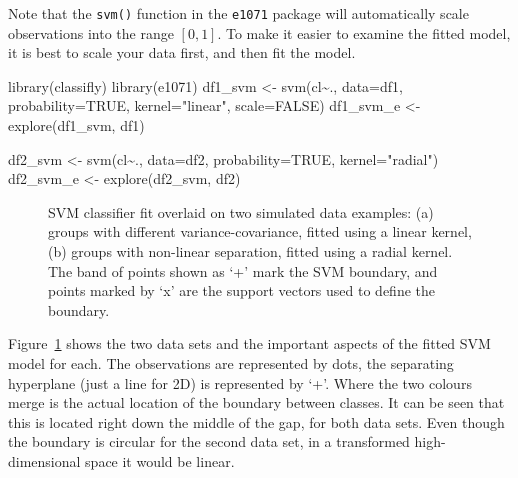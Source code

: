 \documentclass[
  letterpaper,
]{krantz}
\newenvironment{Shaded}{\begin{snugshade}}{\end{snugshade}}
\newcommand{\AttributeTok}[1]{\textcolor[rgb]{0.40,0.45,0.13}{#1}}
\newcommand{\ConstantTok}[1]{\textcolor[rgb]{0.56,0.35,0.01}{#1}}
\newcommand{\FunctionTok}[1]{\textcolor[rgb]{0.28,0.35,0.67}{#1}}
\newcommand{\NormalTok}[1]{\textcolor[rgb]{0.00,0.23,0.31}{#1}}
\newcommand{\OtherTok}[1]{\textcolor[rgb]{0.00,0.23,0.31}{#1}}
\newcommand{\SpecialCharTok}[1]{\textcolor[rgb]{0.37,0.37,0.37}{#1}}
\newcommand{\StringTok}[1]{\textcolor[rgb]{0.13,0.47,0.30}{#1}}
\begin{document}
Note that the \texttt{svm()} function in the \texttt{e1071} package will
automatically scale observations into the range \([0,1]\). To make it
easier to examine the fitted model, it is best to scale your data first,
and then fit the model.

\begin{Shaded}
\begin{Highlighting}[]
\FunctionTok{library}\NormalTok{(classifly)}
\FunctionTok{library}\NormalTok{(e1071)}
\NormalTok{df1\_svm }\OtherTok{\textless{}{-}} \FunctionTok{svm}\NormalTok{(cl}\SpecialCharTok{\textasciitilde{}}\NormalTok{., }\AttributeTok{data=}\NormalTok{df1, }
                     \AttributeTok{probability=}\ConstantTok{TRUE}\NormalTok{, }
                     \AttributeTok{kernel=}\StringTok{"linear"}\NormalTok{, }
               \AttributeTok{scale=}\ConstantTok{FALSE}\NormalTok{)}
\NormalTok{df1\_svm\_e }\OtherTok{\textless{}{-}} \FunctionTok{explore}\NormalTok{(df1\_svm, df1)}

\NormalTok{df2\_svm }\OtherTok{\textless{}{-}} \FunctionTok{svm}\NormalTok{(cl}\SpecialCharTok{\textasciitilde{}}\NormalTok{., }\AttributeTok{data=}\NormalTok{df2,  }
                     \AttributeTok{probability=}\ConstantTok{TRUE}\NormalTok{, }
                     \AttributeTok{kernel=}\StringTok{"radial"}\NormalTok{)}
\NormalTok{df2\_svm\_e }\OtherTok{\textless{}{-}} \FunctionTok{explore}\NormalTok{(df2\_svm, df2)}
\end{Highlighting}
\end{Shaded}

\begin{figure}


\caption{\label{fig-svm-toy}SVM classifier fit overlaid on two simulated
data examples: (a) groups with different variance-covariance, fitted
using a linear kernel, (b) groups with non-linear separation, fitted
using a radial kernel. The band of points shown as `+' mark the SVM
boundary, and points marked by `x' are the support vectors used to
define the boundary.}

\end{figure}%

Figure~\ref{fig-svm-toy} shows the two data sets and the important
aspects of the fitted SVM model for each. The observations are
represented by dots, the separating hyperplane (just a line for 2D) is
represented by `+'. Where the two colours merge is the actual location
of the boundary between classes. It can be seen that this is located
right down the middle of the gap, for both data sets. Even though the
boundary is circular for the second data set, in a transformed
high-dimensional space it would be linear.
\end{document}
